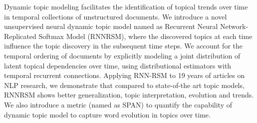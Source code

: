 Dynamic topic modeling facilitates the identification of topical trends over time in temporal collections of unstructured documents. We introduce a novel unsupervised neural dynamic topic model named as Recurrent Neural Network-Replicated Softmax Model (RNNRSM), where the discovered topics at each time influence the topic discovery in the subsequent time steps. We account for the temporal ordering of documents by explicitly modeling a joint distribution of latent topical dependencies over time, using distributional estimators with temporal recurrent connections. Applying RNN-RSM to 19 years of articles on NLP research, we demonstrate that compared to state-of-the art topic models, RNNRSM shows better generalization, topic interpretation, evolution and trends. We also introduce a metric (named as SPAN) to quantify the capability of dynamic topic model to capture word evolution in topics over time.
